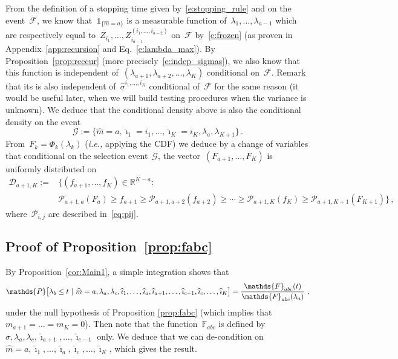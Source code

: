 \documentclass[final,numbib]{imaiai}%
\numberwithin{equation}{section}
\def\eq{\begin{equation}}
\def\qe{\end{equation}}
\def\cD{\mathcal{D}}
\def\cP{\mathcal{P}}
\def\bbF{\mathds{F}}
\def\bbP{\mathds{P}}
\def\bbR{\mathds{R}}
\renewcommand{\hat}{\widehat}
\def\\bUnif{\text{\bUnif}}
\newcommand{\<}{\langle}
\renewcommand{\>}{\rangle}
\newcommand{\1}{\mathds{1}}
\begin{document}
{From the definition of a stopping time given by~\eqref{e:stopping_rule} and on the event~$\mathcal F$, we know that~$\1_{\{\hat m=a\}}$ is a measurable function of~$\lambda_1,\ldots, \lambda_{a-1}$ which are respectively equal to~$Z_{i_1},\ldots,  Z_{i_{a-1}}^{(i_1,\ldots, i_{a-2})}$ on~$\mathcal F$ by~\eqref{e:frozen} (as proven in Appendix~\ref{app:recursion}  and Eq.~\eqref{e:lambda_max}). By Proposition~\ref{prop:reccur} (more precisely~\eqref{e:indep_sigmas}), we also know that this function is independent of~$(\lambda_{a+1},\lambda_{a+2},\ldots,\lambda_K)$ conditional on~$\mathcal F$. Remark that its is also independent of~$\hat \sigma^{i_1,\ldots, i_{K}}$ conditional of~$\mathcal F$ for the same reason (it would be useful later, when we will build testing procedures when the variance is unknown). We deduce that the conditional density above is also the conditional density on the event 
 \[
 \mathcal G:=\big\{\hat m =a,\hat \imath_1 =i_1, \ldots, \hat \imath_{K}=i_{K},\lambda_a,\lambda_{K+1}\big\}\,.
 \]
From~$F_k=\Phi_k(\lambda_k)$ ({\it i.e.,} applying the CDF) we deduce by a change of variables that conditional on the selection event~$ \mathcal G$, the vector~$(F_{a+1},\ldots,F_K)$ is uniformly distributed on 
\begin{align*}
\cD_{a+1,K}:=&
\big\{
(f_{a+1},\ldots,f_K)\in\bbR^{K-a}:\ \\
&\cP_{a+1,a}(F_{a})\geq f_{a+1}\geq \cP_{a+1,a+2}(f_{a+2})%
\geq \cdots
\geq \cP_{a+1,K}(f_K)\geq \cP_{a+1,K+1}(F_{K+1})
\big\}\,,
\end{align*}
where~$\cP_{i,j}$ are described in~\eqref{eq:pij}.

\subsection{Proof of Proposition~\ref{prop:fabc}}
\label{proof:fabc}

By Proposition~\ref{cor:Main1}, a simple integration shows that  
\eq
\notag
\bbP\big[\lambda_b\leq t\ |\ \hat m =a,\lambda_a,\lambda_c, \hat \imath_{1},\ldots,\hat \imath_{a},\hat \imath_{a+1}, \ldots,\hat \imath_{c-1},\hat \imath_{c},\ldots,\hat \imath_{K}\big]=\frac{\bbF_{abc}(t)}{\bbF_{abc}(\lambda_a)} \ ,
\qe
under the null hypothesis of Proposition \ref{prop:fabc} (which implies that~$m_{a+1}=\ldots=m_K=0$). Then note that the function~$\bbF_{abc}$ is defined by~$\sigma,\lambda_a,\lambda_c,\hat \imath_{a+1}, \ldots,\hat \imath_{c-1}$ only. We deduce that we can de-condition on~$\hat m =a, \hat \imath_{1},\ldots,\hat \imath_{a}, \hat \imath_{c},\ldots,\hat \imath_{K}$, which gives the result.

}
\end{document}
